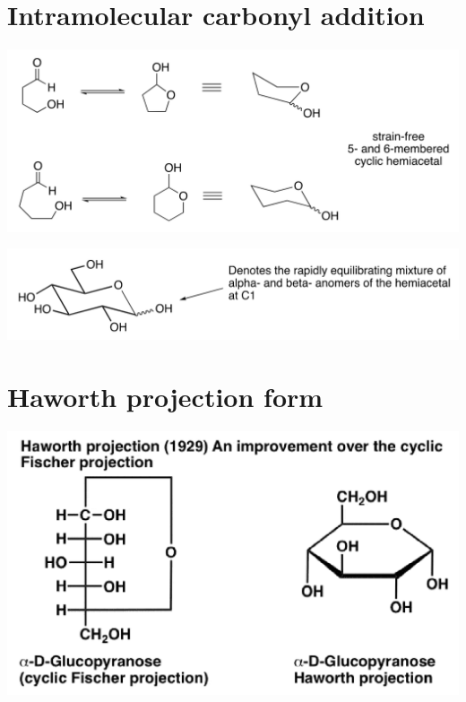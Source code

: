\documentclass[11pt]{article}
\begin{document}
\section{Intramolecular carbonyl addition}
\label{sec:org422c767}
\begin{center}
\includegraphics[width=.9\linewidth]{./images/intramolecular-carbonyl-addition.png}
\end{center}
\begin{center}
\includegraphics[width=.9\linewidth]{./images/rapidly-equilibriating-symbol-explanation.png}
\end{center}


\section{Haworth projection form}
\label{sec:orge39cd80}
\begin{center}
\includegraphics[width=.9\linewidth]{./images/haworth-projection.png}
\end{center}
\end{document}

